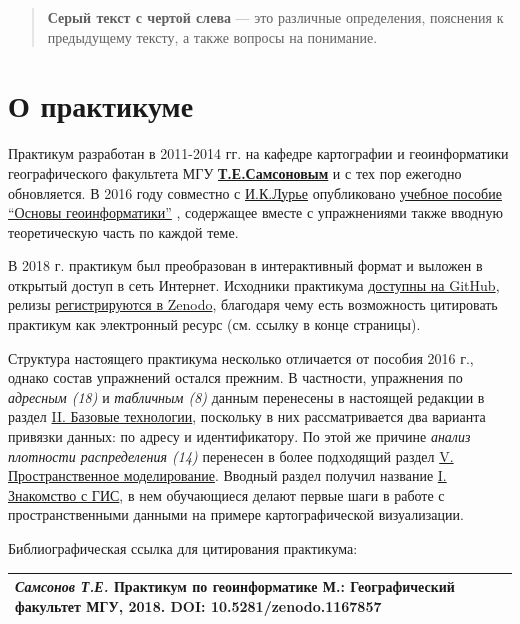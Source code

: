 \documentclass[]{book}
\theoremstyle{definition}
\theoremstyle{definition}
\theoremstyle{definition}
\theoremstyle{remark}
\begin{document}
\begin{quote}
\textbf{Серый текст с чертой слева} --- это различные определения,
пояснения к предыдущему тексту, а также вопросы на понимание.
\end{quote}

\hypertarget{-}{%
\section*{О практикуме}\label{-}}

Практикум разработан в 2011-2014 гг. на кафедре картографии и
геоинформатики географического факультета МГУ
\href{https://istina.msu.ru/profile/tsamsonov/}{\textbf{Т.Е.Самсоновым}}
и с тех пор ежегодно обновляется. В 2016 году совместно с
\href{https://istina.msu.ru/profile/IK_Lurie/}{И.К.Лурье} опубликовано
\href{https://istina.msu.ru/download/45821659/1ej66u:uSUtcUS-XmdMMyRRpC-yflDmCv8/}{учебное
пособие ``Основы геоинформатики''} , содержащее вместе с упражнениями
также вводную теоретическую часть по каждой теме.

В 2018 г. практикум был преобразован в интерактивный формат и выложен в
открытый доступ в сеть Интернет. Исходники практикума
\href{https://github.com/tsamsonov/arcgis-course}{доступны на GitHub},
релизы \href{https://zenodo.org/record/1167857}{регистрируются в
Zenodo}, благодаря чему есть возможность цитировать практикум как
электронный ресурс (см. ссылку в конце страницы).

Структура настоящего практикума несколько отличается от пособия 2016 г.,
однако состав упражнений остался прежним. В частности, упражнения по
\emph{адресным (18)} и \emph{табличным (8)} данным перенесены в
настоящей редакции в раздел \protect\hyperlink{map-ref-general}{II.
Базовые технологии}, поскольку в них рассматривается два варианта
привязки данных: по адресу и идентификатору. По этой же причине
\emph{анализ плотности распределения (14)} перенесен в более подходящий
раздел \protect\hyperlink{density-analysis}{V. Пространственное
моделирование}. Вводный раздел получил название
\protect\hyperlink{map-design-quaternary}{I. Знакомство с ГИС}, в нем
обучающиеся делают первые шаги в работе с пространственными данными на
примере картографической визуализации.

Библиографическая ссылка для цитирования практикума:

\begin{longtable}[]{@{}l@{}}
\toprule
\endhead
\emph{Самсонов Т.Е.} \textbf{Практикум по геоинформатике} М.:
Географический факультет МГУ, 2018. DOI:
10.5281/zenodo.1167857\tabularnewline
\bottomrule
\end{longtable}
\end{document}
